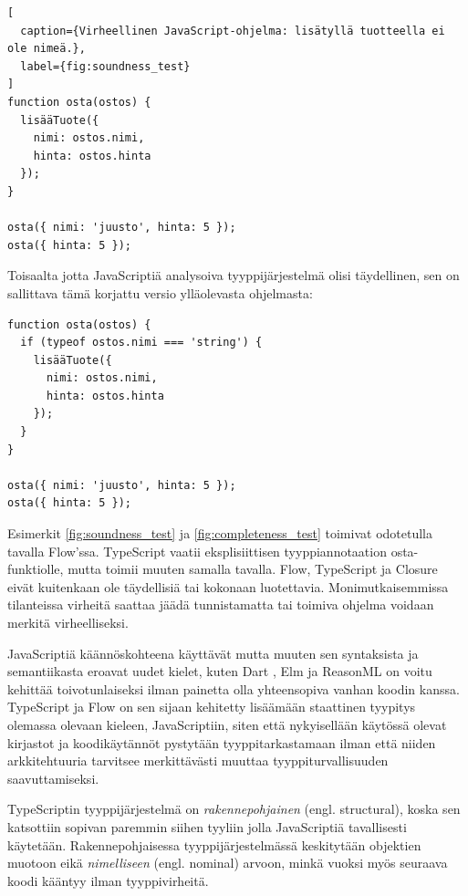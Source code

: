 \begin{lstlisting}[
  caption={Virheellinen JavaScript-ohjelma: lisätyllä tuotteella ei ole nimeä.},
  label={fig:soundness_test}
]
function osta(ostos) {
  lisääTuote({
    nimi: ostos.nimi,
    hinta: ostos.hinta
  });
}

osta({ nimi: 'juusto', hinta: 5 });
osta({ hinta: 5 });
\end{lstlisting}
Toisaalta jotta JavaScriptiä analysoiva tyyppijärjestelmä olisi täydellinen,
sen on sallittava tämä korjattu versio ylläolevasta ohjelmasta:
\begin{lstlisting}[caption={Toimiva JavaScript-ohjelma: virheelliseltä kutsulta on suojauduttu tarkistuksella.},label={fig:completeness_test}]
function osta(ostos) {
  if (typeof ostos.nimi === 'string') {
    lisääTuote({
      nimi: ostos.nimi,
      hinta: ostos.hinta
    });
  }
}

osta({ nimi: 'juusto', hinta: 5 });
osta({ hinta: 5 });
\end{lstlisting}
Esimerkit \ref{fig:soundness_test} ja \ref{fig:completeness_test} toimivat
odotetulla tavalla Flow'ssa. TypeScript vaatii eksplisiittisen tyyppiannotaation
osta-funktiolle, mutta toimii muuten samalla tavalla. Flow, TypeScript ja
Closure eivät kuitenkaan ole täydellisiä tai kokonaan luotettavia.
Monimutkaisemmissa tilanteissa virheitä saattaa jäädä tunnistamatta tai toimiva
ohjelma voidaan merkitä virheelliseksi.

JavaScriptiä käännöskohteena käyttävät
mutta muuten sen syntaksista ja semantiikasta eroavat uudet kielet,
kuten Dart \cite{DartLang}, Elm \cite{ElmLang} ja ReasonML \cite{ReasonMLLang}
on voitu kehittää toivotunlaiseksi ilman painetta olla
yhteensopiva vanhan koodin kanssa. TypeScript ja Flow on sen sijaan kehitetty
lisäämään staattinen tyypitys olemassa olevaan kieleen, JavaScriptiin,
siten että nykyisellään käytössä olevat kirjastot ja koodikäytännöt pystytään
tyyppitarkastamaan ilman että niiden arkkitehtuuria tarvitsee merkittävästi
muuttaa tyyppiturvallisuuden saavuttamiseksi.

TypeScriptin tyyppijärjestelmä on \textit{rakennepohjainen} (engl. structural),
koska sen katsottiin sopivan paremmin siihen tyyliin jolla JavaScriptiä tavallisesti
käytetään. Rakennepohjaisessa tyyppijärjestelmässä keskitytään objektien muotoon
eikä \textit{nimelliseen} (engl. nominal) arvoon, minkä vuoksi myös seuraava koodi kääntyy
ilman tyyppivirheitä.

